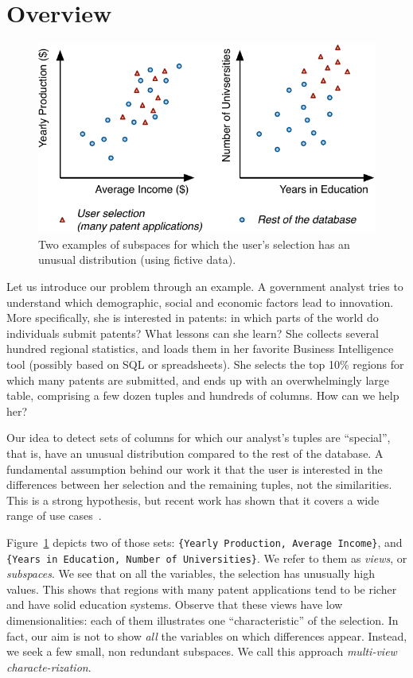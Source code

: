\section{Overview}
\label{sec:genoverview}
\begin{figure}
  \centering
  \includegraphics[width=.86\columnwidth]{Figures/Example}
  \caption{Two examples of subspaces for which the user's selection has an
  unusual distribution (using fictive data).}
  \label{pic:example}
\end{figure}
Let us introduce our problem through an example. A government analyst tries to
understand which demographic, social and economic factors lead to innovation.
More speci\-fi\-cally, she is interested in patents: in which parts of the
world do individuals submit patents? What lessons can she learn? She collects
se\-ve\-ral hundred regional statistics, and loads them in her favorite
Business Intelligence tool (possibly based on SQL or spreadsheets). She selects
the top 10\% regions for which many patents are submitted, and ends up with an
overwhelmingly large table, comprising a few dozen tuples and hundreds of
columns. How can we help her?

Our idea to detect sets of columns for which our analyst's tuples are
``special'', that is, have an unusual distribution compared to the rest of the
database. A fundamental assumption behind our work it that the user is
interested in the differences between her selection and the remaining tuples,
not the similarities.  This is a strong hypothesis, but recent work has shown
that it covers a wide range of use cases~\cite{vartak2015see}.

Figure~\ref{pic:example} depicts two of those sets: \texttt{\{Yearly
Production, Average Income\}}, and \texttt{\{Years in Education, Number of
Universities\}}.  We refer to them as \emph{views}, or \emph{subspaces}.  We
see that on all the variables, the selection has unusually high values.  This
shows that regions with many patent applications tend to be richer and have
solid education systems.  Observe that these views have low dimensionalities:
each of them illustrates one ``characteristic'' of the selection. In fact, our
aim is not to show \emph{all} the variables on which differences appear.
Instead, we seek a few small, non redundant subspaces. We call this approach
\emph{multi-view characte-rization}.

